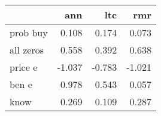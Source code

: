 \begin{tabular}{lrrr}
\toprule
{} &    ann &    ltc &    rmr \\
\midrule
prob buy  &  0.108 &  0.174 &  0.073 \\
all zeros &  0.558 &  0.392 &  0.638 \\
price e   & -1.037 & -0.783 & -1.021 \\
ben e     &  0.978 &  0.543 &  0.057 \\
know      &  0.269 &  0.109 &  0.287 \\
\bottomrule
\end{tabular}
